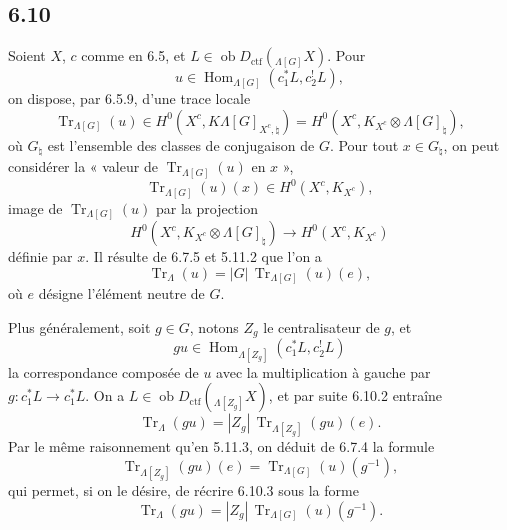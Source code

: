 \documentclass[11pt]{article}
\DeclareMathOperator{\Hom}{Hom}
\providecommand{\Tr}{\operatorname{Tr}}
\providecommand{\Tr}{\operatorname{Tr}}
\providecommand{\Ob}{\operatorname{ob}}
\providecommand{\Tr}{\operatorname{Tr}}
\providecommand{\Hom}{\operatorname{Hom}}
\providecommand{\Ob}{\operatorname{ob}}
\providecommand{\Tr}{\operatorname{Tr}}
\providecommand{\Ob}{\operatorname{Ob}}
\begin{document}
\subsection*{6.10}
Soient $X$, $c$ comme en 6.5, et $L\in\Ob D_{\mathrm{ctf}}({}_{\Lambda[G]}X)$. Pour
\[
u\in\Hom_{\Lambda[G]}(c_1^*L,c_2^!L),
\]
on dispose, par 6.5.9, d'une trace locale
\begin{equation}
\Tr_{\Lambda[G]}(u)\in
H^0(X^c,K\Lambda[G]_{X^c,\natural})
=H^0(X^c,K_{X^c}\otimes\Lambda[G]_{\natural}),
\tag{6.10.1}
\end{equation}
où $G_{\natural}$ est l'ensemble des classes de conjugaison de $G$. Pour tout $x\in G_{\natural}$, on peut considérer la « valeur de $\Tr_{\Lambda[G]}(u)$ en $x$ »,
\[
\Tr_{\Lambda[G]}(u)(x)\in H^0(X^c,K_{X^c}),
\]
image de $\Tr_{\Lambda[G]}(u)$ par la projection
\[
H^0(X^c,K_{X^c}\otimes\Lambda[G]_{\natural})
\longrightarrow H^0(X^c,K_{X^c})
\]
définie par $x$. Il résulte de 6.7.5 et 5.11.2 que l'on a
\begin{equation}
\Tr_{\Lambda}(u)=|G|\,\Tr_{\Lambda[G]}(u)(e),
\tag{6.10.2}
\end{equation}
où $e$ désigne l'élément neutre de $G$.

Plus généralement, soit $g\in G$, notons $Z_g$ le centralisateur de $g$, et
\[
gu\in\Hom_{\Lambda[Z_g]}(c_1^*L,c_2^!L)
\]
la correspondance composée de $u$ avec la multiplication à gauche par $g:c_1^*L\to c_1^*L$. On a $L\in\Ob D_{\mathrm{ctf}}({}_{\Lambda[Z_g]}X)$, et par suite 6.10.2 entraîne
\begin{equation}
\Tr_{\Lambda}(gu)=|Z_g|\,\Tr_{\Lambda[Z_g]}(gu)(e).
\tag{6.10.3}
\end{equation}
Par le même raisonnement qu'en 5.11.3, on déduit de 6.7.4 la formule
\begin{equation}
\Tr_{\Lambda[Z_g]}(gu)(e)=\Tr_{\Lambda[G]}(u)(g^{-1}),
\tag{6.10.4}
\end{equation}
qui permet, si on le désire, de récrire 6.10.3 sous la forme
\begin{equation}
\Tr_{\Lambda}(gu)=|Z_g|\,\Tr_{\Lambda[G]}(u)(g^{-1}).
\tag{6.10.5}
\end{equation}
\end{document}
